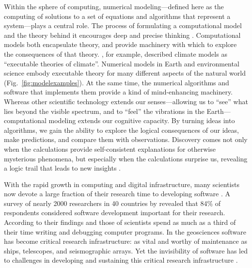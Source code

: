 \documentclass[journal abbreviation, manuscript]{copernicus}
\begin{document}
Within the sphere of computing, numerical modeling---defined here as the computing of solutions to a set of equations and algorithms that represent a system---plays a central role. The process of formulating a computational model and the theory behind it encourages deep and precise thinking \citep[e.g.,][]{guest2020computational}. Computational models both encapsulate theory, and provide machinery with which to explore the consequences of that theory. \citet{pipitone2012assessing}, for example, described climate models as ``executable theories of climate''. Numerical models in Earth and environmental science embody executable theory for many different aspects of the natural world (Fig.~\ref{fig:modelexamples}). At the same time, the numerical algorithms and software that implements them provide a kind of mind-enhancing machinery. Whereas other scientific technology extends our senses---allowing us to ``see'' what lies beyond the visible spectrum, and to ``feel'' the vibrations in the Earth---computational modeling extends our cognitive capacity. By turning ideas into algorithms, we gain the ability to explore the logical consequences of our ideas, make predictions, and compare them with observations. Discovery comes not only when the calculations provide self-consistent explanations for otherwise mysterious phenomena, but especially when the calculations surprise us, revealing a logic trail that leads to new insights \citep{bras2003six}.


With the rapid growth in computing and digital infrastructure, many scientists now devote a large fraction of their research time to developing software \citep{hannay2009scientists,prabhu2011survey,wilson2014best,singh2016unsung,pinto2018scientists}. A survey of nearly 2000 researchers in 40 countries by \citet{hannay2009scientists} revealed that 84\% of respondents considered software development important for their research. According to their findings and those of \citet{prabhu2011survey} scientists spend as much as a third of their time writing and debugging computer programs. In the geosciences  software has become critical research infrastructure: as vital and worthy of maintenance as ships, telescopes, and seismographic arrays. Yet the invisibility of software  has led to challenges in developing and sustaining this critical research infrastructure \citep{eghbal2016roads}.
\end{document}
